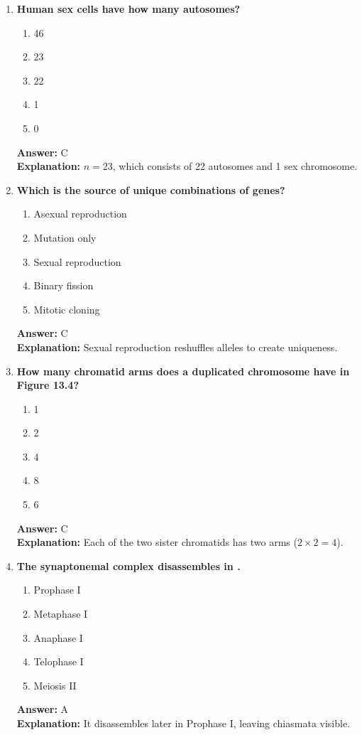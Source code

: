 \documentclass[11pt, a4paper]{article}
\begin{document}
\begin{enumerate}[leftmargin=*, label=\arabic*.]
\item \textbf{Human sex cells have how many autosomes?}
\begin{enumerate}[label=\Alph*.]
\item 46
\item 23
\item 22
\item 1
\item 0
\end{enumerate}
\textbf{Answer:} C \\
\textbf{Explanation:} $n = 23$, which consists of 22 autosomes and 1 sex chromosome.

\item \textbf{Which is the source of unique combinations of genes?}
\begin{enumerate}[label=\Alph*.]
\item Asexual reproduction
\item Mutation only
\item Sexual reproduction
\item Binary fission
\item Mitotic cloning
\end{enumerate}
\textbf{Answer:} C \\
\textbf{Explanation:} Sexual reproduction reshuffles alleles to create uniqueness.

\item \textbf{How many chromatid arms does a duplicated chromosome have in Figure 13.4?}
\begin{enumerate}[label=\Alph*.]
\item 1
\item 2
\item 4
\item 8
\item 6
\end{enumerate}
\textbf{Answer:} C \\
\textbf{Explanation:} Each of the two sister chromatids has two arms ($2 \times 2 = 4$).

\item \textbf{The synaptonemal complex disassembles in \underline{\hspace{1cm}}.}
\begin{enumerate}[label=\Alph*.]
\item Prophase I
\item Metaphase I
\item Anaphase I
\item Telophase I
\item Meiosis II
\end{enumerate}
\textbf{Answer:} A \\
\textbf{Explanation:} It disassembles later in Prophase I, leaving chiasmata visible.


\end{enumerate}
\end{document}

